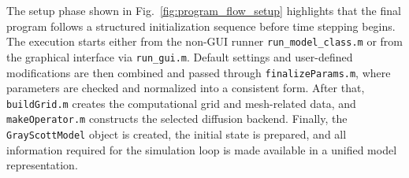 The setup phase shown in Fig.~\ref{fig:program_flow_setup} highlights that the final program follows a structured initialization sequence before time stepping begins. The execution starts either from the non-GUI runner \texttt{run\_model\_class.m} or from the graphical interface via \texttt{run\_gui.m}. Default settings and user-defined modifications are then combined and passed through \texttt{finalizeParams.m}, where parameters are checked and normalized into a consistent form. After that, \texttt{buildGrid.m} creates the computational grid and mesh-related data, and \texttt{makeOperator.m} constructs the selected diffusion backend. Finally, the \texttt{GrayScottModel} object is created, the initial state is prepared, and all information required for the simulation loop is made available in a unified model representation.

